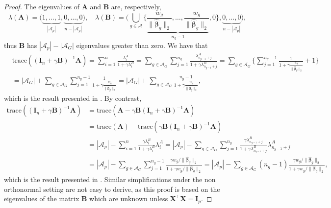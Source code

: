 \documentclass[a4paper, 12pt]{article}
\newcommand{\Aset}{\mathcal{A}}
\newcommand{\trace}{\mathrm{trace}}
\newcommand{\T}{\top}
\def\bbeta{\boldsymbol{\beta}}
\def\bA{\mathbf{A}}
\def\bB{\mathbf{B}}
\def\bI{\mathbf{I}}
\def\bX{\mathbf{X}}
\begin{document}
\begin{proof}
The eigenvalues of $\bA$ and $\bB$ are, respectively,  
$$ \lambda(\bA)= \big(\underbrace{1, \ldots, 1}_{|\Aset_p|}, \underbrace{0, \ldots, 0}_{n-|\Aset_p|}\big), \quad \lambda(\bB) = \bigg(\bigcup_{g \in \Aset} \bigg\{ \underbrace{\frac{w_g}{\lVert \widehat{\bbeta}_g \rVert_2}, \ldots, \frac{w_g}{\lVert \widehat{\bbeta}_g \rVert_2}}_{n_g-1}, 0 \bigg\}, \underbrace{0, \ldots, 0 }_{n-|\Aset_p|}\bigg),$$
thus $\bB$ has $|\Aset_p| - |\Aset_G|$ eigenvalues greater than zero. We have that 
\begin{align*}
&\trace ((\bI_n+\gamma\bB)^{-1}\bA) =\sum_{i=1}^n \frac{\lambda_i^A}{1+\gamma\lambda_i^B} = \sum_{g \in \Aset_G} \sum_{j=1}^{n_g} \frac{\lambda_{n_{g-1}+j}^A}{1+\gamma\lambda_{n_{g-1}+j}^B} = \sum_{g \in \Aset_G} \bigg\{\sum_{j=1}^{n_g-1} \frac{1}{1+\gamma \frac{w_g}{\lVert \widehat{\bbeta}_g \rVert_2}} + 1 \bigg\}\\ 
&=|\Aset_G| + \sum_{g \in \Aset_G}\sum_{j =1}^{n_g-1} \frac{1}{1+\gamma \frac{w_g}{\lVert \widehat{\bbeta}_g \rVert_2}}=
|\Aset_G| + \sum_{g \in \Aset_G} \frac{n_g-1}{1+\gamma\frac{w_g}{\lVert \widehat{\bbeta}_g\rVert_2} },
\end{align*}
which is the result presented in \cite{yuan:2006:glasso}. By contrast,
\begin{align*}
\trace ((\bI_n+\gamma\bB)^{-1}\bA) &= \trace (\bA - \gamma\bB(\bI_n+\gamma\bB)^{-1}\bA)\\ &= \trace (\bA) - \trace (\gamma\bB(\bI_n+\gamma\bB)^{-1}\bA)\\
&=|\Aset_p| - \sum_{i=1}^n \frac{\gamma \lambda_i^B}{1+\gamma\lambda_i^B} \lambda_i^A = |\Aset_p| - \sum_{g \in \Aset_G} \sum_{j=1}^{n_g} \frac{\gamma \lambda_{n_{g-1}+j}^B}{1+\gamma\lambda_{n_{g-1}+j}^B}\lambda_{n_{g-1}+j}^A\\  
&=|\Aset_p| - \sum_{g \in \Aset_G} \sum_{j=1}^{n_g-1} \frac{\gamma w_g / \lVert \widehat{\bbeta}_g \rVert_2}{1+\gamma w_g / \lVert \widehat{\bbeta}_g \rVert_2}= |\Aset_p| - \sum_{g \in \Aset_G} (n_g-1)\frac{\gamma w_g / \lVert \widehat{\bbeta}_g \rVert_2}{1+\gamma w_g / \lVert \widehat{\bbeta}_g \rVert_2},
\end{align*}
which is the result presented in \cite{vaiter_etal.2017}. Similar simplifications under the non orthonormal setting are not easy to derive, as this proof is based on the eigenvalues of the matrix $\bB$ which are unknown unless $\bX^{\T}\bX=\bI_p$. 
\end{proof}
%
\end{document}
